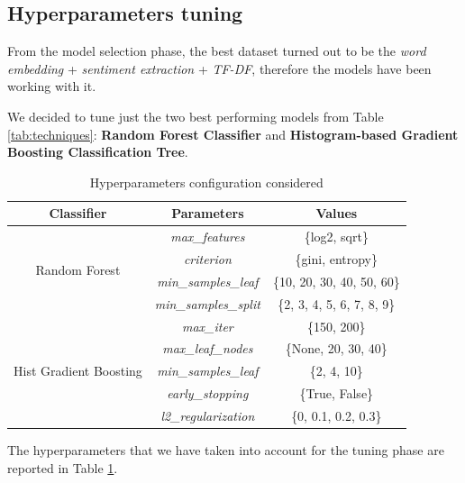 \documentclass[conference]{IEEEtran}
\begin{document}
\subsection{Hyperparameters tuning}\label{sec:hypertuning}
From the model selection phase, the best dataset turned out to be the \textit{word embedding} + \textit{sentiment extraction} + \textit{TF-DF}, therefore the models have been working with it.

We decided to tune just the two best performing models from Table \ref{tab:techniques}: \textbf{Random Forest Classifier} and \textbf{Histogram-based Gradient Boosting Classification Tree}.
\begin{table}[h]
\begin{tabular}{ccc}
\hline
\textbf{Classifier}                     & \textbf{Parameters}          & \textbf{Values}            \\ \hline
\multirow{4}{*}{Random Forest}          & \textit{max\_features}       & \{log2, sqrt\}             \\
                                        & \textit{criterion}           & \{gini, entropy\}          \\
                                        & \textit{min\_samples\_leaf}  & \{10, 20, 30, 40, 50, 60\} \\
                                        & \textit{min\_samples\_split} & \{2, 3, 4, 5, 6, 7, 8, 9\} \\ \hline
\multirow{5}{*}{Hist Gradient Boosting} & \textit{max\_iter}           & \{150, 200\}               \\
                                        & \textit{max\_leaf\_nodes}    & \{None, 20, 30, 40\}       \\
                                        & \textit{min\_samples\_leaf}  & \{2, 4, 10\}               \\
                                        & \textit{early\_stopping}     & \{True, False\}            \\
                                        & \textit{l2\_regularization}  & \{0, 0.1, 0.2, 0.3\}       \\ \hline
\end{tabular}
\caption{Hyperparameters configuration considered}
\label{tab:hypertuning}
\end{table}
The hyperparameters that we have taken into account for the tuning phase are reported in Table \ref{tab:hypertuning}.
\end{document}
